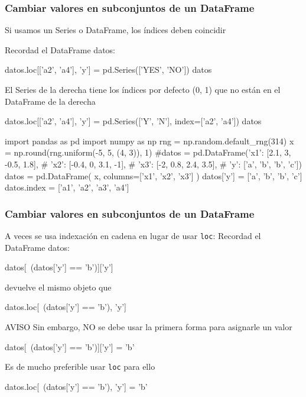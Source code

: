 \documentclass[9pt]{beamer}
\begin{document}
\begin{frame}[fragile]
  \frametitle{Cambiar valores en subconjuntos de un DataFrame}
  \begin{block}{}
    Si usamos un Series o DataFrame, los índices deben coincidir
  \end{block}
Recordad  el DataFrame datos:\smallskip
  
{\footnotesize
  }
\pause

{\footnotesize
   \begin{pyconsole}
datos.loc[['a2', 'a4'], 'y'] = pd.Series(['YES', 'NO']) 
datos
   \end{pyconsole}
   \pause
   \alert{El Series de la derecha tiene los índices por defecto (0, 1) que no están en el DataFrame de la derecha}
\pause
      \begin{pyconsole}
datos.loc[['a2', 'a4'], 'y'] = pd.Series(['Y', 'N'], index=['a2', 'a4']) 
datos
   \end{pyconsole}
}
   
\end{frame}
  \begin{pyconcode}
import pandas as pd
import numpy as np
rng = np.random.default_rng(314)
x = np.round(rng.uniform(-5, 5, (4, 3)), 1)
#datos = pd.DataFrame({'x1': [2.1, 3, -0.5, 1.8],
#  'x2': [-0.4, 0, 3.1, -1],
#  'x3': [-2, 0.8, 2.4, 3.5],
#  'y': ['a', 'b', 'b', 'c']})
datos = pd.DataFrame(
    x,
    columns=['x1', 'x2', 'x3']
    )
datos['y'] = ['a', 'b', 'b', 'c']
datos.index = ['a1', 'a2', 'a3', 'a4']
  \end{pyconcode}
\begin{frame}[fragile]
  \frametitle{Cambiar valores en subconjuntos de un DataFrame}
  A veces se usa indexación en cadena en lugar de usar {\tt loc}:
Recordad  el DataFrame datos:\smallskip
  
{\footnotesize
  }
\pause

\begin{pyconsole}
datos[~(datos['y'] == 'b')]['y']
\end{pyconsole}
\pause
devuelve el mismo objeto que
\begin{pyconsole}
datos.loc[~(datos['y'] == 'b'), 'y']
\end{pyconsole}

\pause
\begin{block}{ AVISO}
  Sin embargo, NO se debe usar la primera forma para asignarle un valor
  \begin{pyverbatim}
datos[~(datos['y'] == 'b')]['y'] = 'b'
  \end{pyverbatim}
  Es de mucho preferible usar {\tt loc} para ello
\begin{pyverbatim}
datos.loc[~(datos['y'] == 'b'), 'y'] = 'b'
\end{pyverbatim}
  \end{block}

   
\end{frame}
\end{document}
